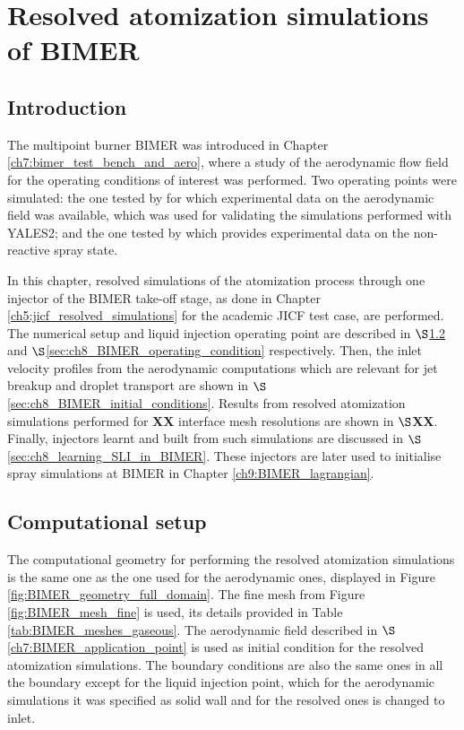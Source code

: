 \chapter{Resolved atomization simulations of BIMER}
\label{ch8:bimer_resolved_atomization}


\section{Introduction}

The multipoint burner BIMER was introduced in Chapter \ref{ch7:bimer_test_bench_and_aero}, where a study of the aerodynamic flow field for the operating conditions of interest was performed. Two operating points were simulated: the one tested by  for which experimental data on the aerodynamic field was available, which was used for validating the simulations performed with YALES2; and the one tested by  which provides experimental data on the non-reactive spray state. 

In this chapter, resolved simulations of the atomization process through one injector of the BIMER take-off stage, as done in Chapter \ref{ch5:jicf_resolved_simulations} for the academic JICF test case, are performed. The numerical setup and liquid injection operating point are described in $\S$\ref{sec:ch8_BIMER_computational_setup} and $\S$\ref{sec:ch8_BIMER_operating_condition} respectively. Then, the inlet velocity profiles from the aerodynamic computations which are relevant for jet breakup and droplet transport are shown in $\S$\ref{sec:ch8_BIMER_initial_conditions}. Results from resolved atomization simulations performed for \textbf{XX} interface mesh resolutions are shown in $\S$\textbf{XX}. Finally, injectors learnt and built from such simulations are discussed in $\S$\ref{sec:ch8_learning_SLI_in_BIMER}. These injectors are later used to initialise spray simulations at BIMER in Chapter \ref{ch9:BIMER_lagrangian}.



\section{Computational setup}
\label{sec:ch8_BIMER_computational_setup}

The computational geometry for performing the resolved atomization simulations is the same one as the one used for the aerodynamic ones, displayed in Figure \ref{fig:BIMER_geometry_full_domain}. The fine mesh from Figure \ref{fig:BIMER_mesh_fine} is used, its details provided in Table \ref{tab:BIMER_meshes_gaseous}. The aerodynamic field described in $\S$\ref{ch7:BIMER_application_point} is used as initial condition for the resolved atomization simulations. The boundary conditions are also the same ones in all the boundary except for the liquid injection point, which for the aerodynamic simulations it was specified as solid wall and for the resolved ones is changed to inlet. 

